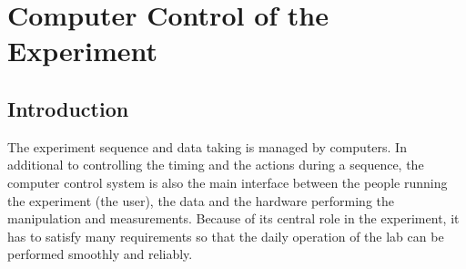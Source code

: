 
\chapter{Computer Control of the Experiment}
\label{ch:computer-control}

\section{Introduction}

The experiment sequence and data taking is managed by computers.
In additional to controlling the timing and the actions during a sequence,
the computer control system is also the main interface
between the people running the experiment (the user),
the data and the hardware performing the manipulation and measurements.
Because of its central role in the experiment,
it has to satisfy many requirements so that
the daily operation of the lab can be performed smoothly and reliably.
